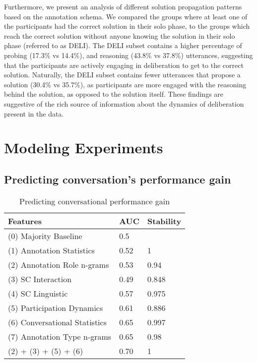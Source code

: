 \documentclass[acmsmall,manuscript,screen]{acmart}
\newcommand\newtext[1]{\textcolor{black}{#1}}
\begin{document}
Furthermore, we present an analysis of different solution propagation patterns based on the annotation schema. We compared the groups where at least one of the participants had the correct solution in their solo phase, to the groups which reach the correct solution without anyone knowing the solution in their solo phase (referred to as DELI). The DELI subset contains a higher percentage of probing (17.3\% vs 14.4\%), and reasoning (43.8\% vs 37.8\%) utterances, suggesting that the participants are actively engaging in deliberation to get to the correct solution. Naturally, the DELI subset contains fewer utterances that propose a solution (30.4\% vs 35.7\%), as participants are more engaged with the reasoning behind the solution, \newtext{as} opposed to the solution itself. These findings 
are suggestive of the rich source of information about the dynamics of deliberation present in the data.


\section{Modeling Experiments}
\label{sec:modeling}
\subsection{Predicting conversation's performance gain}

\begin{table}[th!]
\centering
    \begin{tabular}{|l|l|l|}
    \hline 
    \textbf{Features} & \textbf{AUC} & \textbf{Stability} \\
\hline 
    (0) Majority Baseline & 0.5 &  \\ \hline 
    (1) Annotation Statistics & 0.52 & 1 \\ \hline
    (2) Annotation Role n-grams & 0.53 & 0.94 \\ \hline
    (3) SC Interaction  & 0.49 & 0.848 \\ \hline 
    (4) SC Linguistic  & 0.57 & 0.975\\ \hline 
    (5) Participation Dynamics & 0.61 & 0.886 \\ \hline
    (6) Conversational Statistics & 0.65 & 0.997 \\ \hline 
    (7) Annotation Type n-grams & 0.65 & 0.98 \\ \hline 
    (2) + (3) + (5) + (6) & 0.70 & 1 \\ \hline 
\end{tabular}
\caption{Predicting conversational performance gain}
\label{table:predicting_outcome_results}
\end{table}
\end{document}
